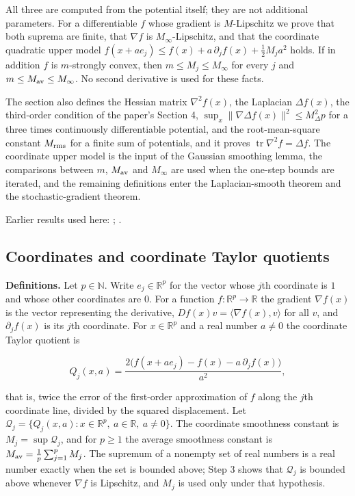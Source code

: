 \documentclass[11pt,a4paper]{report}
\begin{document}
All three are computed from the potential itself; they are not additional parameters. For a differentiable \(f\) whose gradient is \(M\)-Lipschitz we prove that both suprema are finite, that \(\nabla f\) is \(M_\infty\)-Lipschitz, and that the coordinate quadratic upper model \(f(x+ae_j)\le f(x)+a\,\partial_jf(x)+\tfrac12M_ja^2\) holds. If in addition \(f\) is \(m\)-strongly convex, then \(m\le M_j\le M_\infty\) for every \(j\) and \(m\le M_{\rm av}\le M_\infty\). No second derivative is used for these facts.




The section also defines the Hessian matrix \(\nabla^2f(x)\), the Laplacian \(\Delta f(x)\), the third-order condition of the paper's Section 4, \(\sup_x\|\nabla\Delta f(x)\|^2\le M_\Delta^2p\) for a three times continuously differentiable potential, and the root-mean-square constant \(M_{\rm rms}\) for a finite sum of potentials, and it proves \(\operatorname{tr}\nabla^2f=\Delta f\). The coordinate upper model is the input of the Gaussian smoothing lemma, the comparisons between \(m\), \(M_{\rm av}\) and \(M_\infty\) are used when the one-step bounds are iterated, and the remaining definitions enter the Laplacian-smooth theorem and the stochastic-gradient theorem.



Earlier results used here: \cite[Section~3.9]{LangevinLean2026ULASC}; \cite[Section~3.2]{LangevinLean2026ULASC}.
\subsection{\texorpdfstring{Coordinates and coordinate Taylor quotients}{Coordinates and coordinate Taylor quotients}}
\label{report-step-AverageLMC-Assumptions-lean-1}


\textbf{Definitions.} Let \(p\in\mathbb N\). Write \(e_j\in\mathbb R^p\) for the vector whose \(j\)th coordinate is \(1\) and whose other coordinates are \(0\). For a function \(f:\mathbb R^p\to\mathbb R\) the gradient \(\nabla f(x)\) is the vector representing the derivative, \(Df(x)v=\langle\nabla f(x),v\rangle\) for all \(v\), and \(\partial_jf(x)\) is its \(j\)th coordinate. For \(x\in\mathbb R^p\) and a real number \(a\ne0\) the coordinate Taylor quotient is


\[Q_j(x,a)=\frac{2\bigl(f(x+ae_j)-f(x)-a\,\partial_jf(x)\bigr)}{a^2},\]


that is, twice the error of the first-order approximation of \(f\) along the \(j\)th coordinate line, divided by the squared displacement. Let \(\mathcal Q_j=\{Q_j(x,a):x\in\mathbb R^p,\ a\in\mathbb R,\ a\ne0\}\). The coordinate smoothness constant is \(M_j=\sup\mathcal Q_j\), and for \(p\ge1\) the average smoothness constant is \(M_{\rm av}=\frac1p\sum_{j=1}^pM_j\). The supremum of a nonempty set of real numbers is a real number exactly when the set is bounded above; Step 3 shows that \(\mathcal Q_j\) is bounded above whenever \(\nabla f\) is Lipschitz, and \(M_j\) is used only under that hypothesis.
\end{document}

